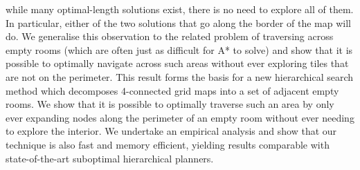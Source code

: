 while many optimal-length solutions exist,
there is no need to explore all of them. In particular,
either of the two solutions that go along the border of the map will do.
We generalise this observation to the related problem of traversing across empty rooms (which are 
often just as difficult for A* to solve) and show that it is possible to optimally navigate across 
such areas without ever exploring tiles that are not on the perimeter.
This result forms the basis for a new hierarchical search method which decomposes 4-connected grid maps
into a set of adjacent empty rooms. 
We show that it is possible to optimally traverse such an area by only ever expanding nodes along the
perimeter of an empty room without ever needing to explore the interior.
We undertake an empirical analysis and show that our technique is also fast and memory efficient,
yielding results comparable with state-of-the-art suboptimal hierarchical planners.
